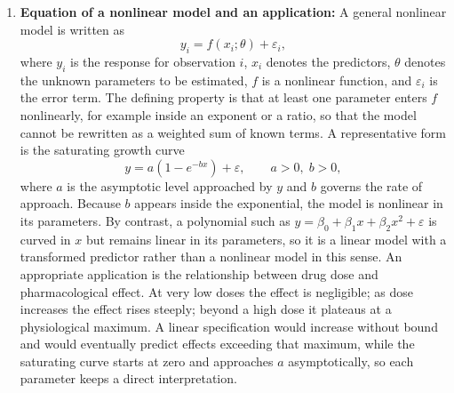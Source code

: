 \documentclass[conference]{IEEEtran}
\begin{document}
\begin{enumerate}
    \item \textbf{Equation of a nonlinear model and an application:} A general nonlinear model is written as
    \begin{equation}
        y_i = f(x_i; \theta) + \varepsilon_i,
    \end{equation}
    where $y_i$ is the response for observation $i$, $x_i$ denotes the predictors, $\theta$ denotes the unknown parameters to be estimated, $f$ is a nonlinear function, and $\varepsilon_i$ is the error term. The defining property is that at least one parameter enters $f$ nonlinearly, for example inside an exponent or a ratio, so that the model cannot be rewritten as a weighted sum of known terms. A representative form is the saturating growth curve
    \begin{equation}
        y = a\left(1 - e^{-bx}\right) + \varepsilon, \qquad a > 0,\; b > 0,
    \end{equation}
    where $a$ is the asymptotic level approached by $y$ and $b$ governs the rate of approach. Because $b$ appears inside the exponential, the model is nonlinear in its parameters. By contrast, a polynomial such as $y = \beta_0 + \beta_1 x + \beta_2 x^2 + \varepsilon$ is curved in $x$ but remains linear in its parameters, so it is a linear model with a transformed predictor rather than a nonlinear model in this sense. An appropriate application is the relationship between drug dose and pharmacological effect. At very low doses the effect is negligible; as dose increases the effect rises steeply; beyond a high dose it plateaus at a physiological maximum. A linear specification would increase without bound and would eventually predict effects exceeding that maximum, while the saturating curve starts at zero and approaches $a$ asymptotically, so each parameter keeps a direct interpretation.


\end{enumerate}
\end{document}
